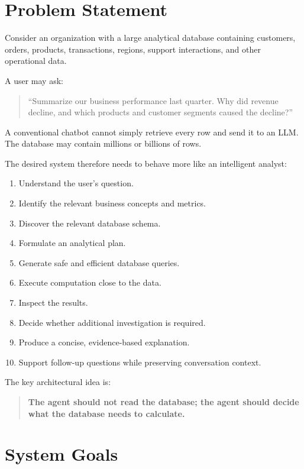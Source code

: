 \documentclass[11pt,a4paper]{article}
\newcommand{\important}[1]{\textbf{#1}}
\begin{document}
\section{Problem Statement}

Consider an organization with a large analytical database containing
customers, orders, products, transactions, regions, support interactions, and
other operational data.

A user may ask:

\begin{quote}
``Summarize our business performance last quarter. Why did revenue decline,
and which products and customer segments caused the decline?''
\end{quote}

A conventional chatbot cannot simply retrieve every row and send it to an
LLM. The database may contain millions or billions of rows.

The desired system therefore needs to behave more like an intelligent
analyst:

\begin{enumerate}[leftmargin=*]
    \item Understand the user's question.
    \item Identify the relevant business concepts and metrics.
    \item Discover the relevant database schema.
    \item Formulate an analytical plan.
    \item Generate safe and efficient database queries.
    \item Execute computation close to the data.
    \item Inspect the results.
    \item Decide whether additional investigation is required.
    \item Produce a concise, evidence-based explanation.
    \item Support follow-up questions while preserving conversation context.
\end{enumerate}

The key architectural idea is:

\begin{quote}
\important{The agent should not read the database; the agent should decide
what the database needs to calculate.}
\end{quote}

\section{System Goals}
\end{document}
